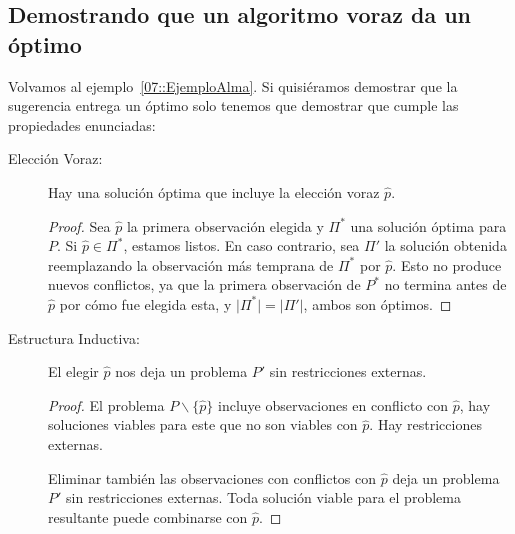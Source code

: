 \subsection{Demostrando que un algoritmo voraz da un óptimo}

  Volvamos al ejemplo~\ref{07::EjemploAlma}.
  Si quisiéramos demostrar que la sugerencia entrega un óptimo
  solo tenemos que demostrar que cumple las propiedades enunciadas:
  \begin{description}
  \item[Elección Voraz:]
    Hay una solución óptima que incluye la elección voraz \(\widehat{p}\).
    \begin{proof}
      Sea \(\widehat{p}\) la primera observación elegida
      y \(\Pi^*\) una solución óptima para \(P\).
      Si \(\widehat{p} \in \Pi^*\),
      estamos listos.
      En caso contrario,
      sea \(\Pi'\) la solución obtenida
      reemplazando la observación más temprana de \(\Pi^*\) por \(\widehat p\).
      Esto no produce nuevos conflictos,
      ya que la primera observación de \(P^*\)
      no termina antes de \(\widehat{p}\)
      por cómo fue elegida esta,
      y \(\lvert \Pi^* \rvert = \lvert \Pi' \rvert\),
      ambos son óptimos.
    \end{proof}
  \item[Estructura Inductiva:]
    El elegir \(\widehat p\) nos deja un problema \(P'\)
    sin restricciones externas.
    \begin{proof}
      El problema \(P \smallsetminus \{ \widehat{p} \}\)
      incluye observaciones en conflicto con \(\widehat{p}\),
      hay soluciones viables para este que no son viables con \(\widehat{p}\).
      Hay restricciones externas.

      Eliminar también las observaciones con conflictos con \(\widehat{p}\)
      deja un problema \(P'\) sin restricciones externas.
      Toda solución viable para el problema resultante
      puede combinarse con \(\widehat{p}\).


\end{proof}
\end{description}
